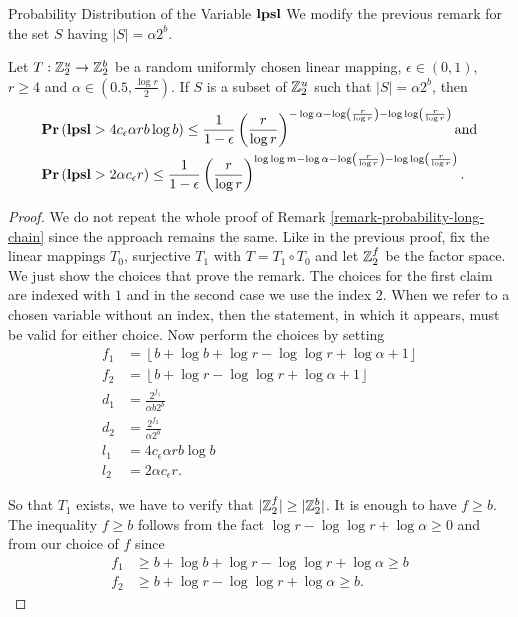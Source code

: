 \begin{section}{Probability Distribution of the Variable \texorpdfstring{$\mathbf{lpsl}$}{lpsl}}
We modify the previous remark for the set $S$ having $|S| = \alpha 2 ^ b$.
\begin{remark}
\label{remark-lpsl-pdf-linear-amount}
Let $T: \mathbb{Z}_{2}^{u} \rightarrow \mathbb{Z}_{2}^{b}$ be a random uniformly chosen linear mapping, $\epsilon \in (0, 1)$, $r \geq 4$ and $\alpha \in (0.5, \frac{\log r}{2})$. If $S$ is a subset of $\mathbb{Z}_{2}^{u}$ such that $|S| = \alpha 2 ^ b$, then
\[
\begin{split}
& \mathbf{Pr}\left(\mathbf{lpsl} > 4 c_\epsilon \alpha r b \log b\right) \leq \frac{1}{1 - \epsilon} \left(\frac{r}{\log r}\right)^{-\log \alpha - \log \left(\frac{r}{\log r}\right) - \log \log \left(\frac{r}{\log r}\right)} \text{and} \\
& \mathbf{Pr}\left(\mathbf{lpsl} > 2 \alpha c_\epsilon r\right) \leq \frac{1}{1 - \epsilon}\left(\frac{r}{\log r}\right)^{\log \log m - \log \alpha - \log \left(\frac{r}{\log r}\right) - \log \log \left(\frac{r}{\log r}\right)} \text{.}
\end{split}
\]
\end{remark}
\begin{proof}
We do not repeat the whole proof of Remark \ref{remark-probability-long-chain} since the approach remains the same. Like in the previous proof, fix the linear mappings $T_0$, surjective $T_1$ with $T = T_1 \circ T_0$ and let $\mathbb{Z}_{2}^{f}$ be the factor space. We just show the choices that prove the remark. The choices for the first claim are indexed with $1$ and in the second case we use the index $2$. When we refer to a chosen variable without an index, then the statement, in which it appears, must be valid for either choice.
Now perform the choices by setting
\[
\begin{split}
	f_1 & = \left\lfloor b + \log b + \log r - \log \log r + \log \alpha + 1 \right\rfloor \\
	f_2 & = \left\lfloor b + \log r - \log \log r + \log \alpha + 1 \right\rfloor \\
	d_1 & = \frac{2 ^ {f_1}}{\alpha b 2 ^ b} \\
	d_2 & = \frac{2 ^ {f_2}}{\alpha 2 ^ b} \\
	l_1 & = 4 c_\epsilon \alpha r b \log b \\
	l_2 & = 2 \alpha c_\epsilon r \text{.}
\end{split}
\]

So that $T_1$ exists, we have to verify that $|\mathbb{Z}_{2}^{f}| \geq |\mathbb{Z}_{2}^{b}|$. It is enough to have $f \geq b$. The inequality $f \geq b$ follows from the fact $\log r - \log \log r + \log \alpha \geq 0$ and from our choice of $f$ since
\[
\begin{split}
	f_1 & \geq b + \log b + \log r - \log \log r + \log \alpha \geq b \\
	f_2 & \geq b + \log r - \log \log r + \log \alpha \geq b \text{.}
\end{split}
\]


\end{proof}
\end{section}
